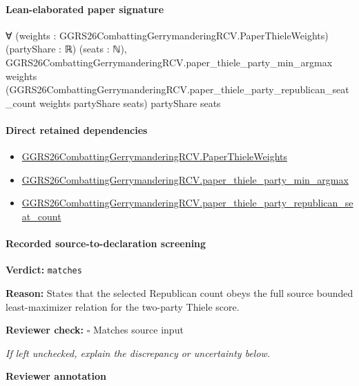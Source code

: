 \documentclass[10pt]{article}
\newcommand{\reviewerbox}{%
  \par\noindent\fbox{\parbox{0.96\linewidth}{\rule{0pt}{0.38in}}}\par
}
\newcommand{\reviewmatch}[1]{%
  \par\noindent\textbf{Reviewer check:} $\square$\; #1\par
  \noindent\emph{If left unchecked, explain the discrepancy or uncertainty below.}\par
}
\begin{document}
\paragraph{Lean-elaborated paper signature}
\begin{ReviewVerbatim}
∀ (weights : GGRS26CombattingGerrymanderingRCV.PaperThieleWeights) (partyShare : ℝ) (seats : ℕ),
  GGRS26CombattingGerrymanderingRCV.paper_thiele_party_min_argmax weights
    (GGRS26CombattingGerrymanderingRCV.paper_thiele_party_republican_seat_count weights partyShare seats) partyShare
    seats
\end{ReviewVerbatim}

\paragraph{Direct retained dependencies}
\begin{itemize}\raggedright
\item \hyperlink{paper-prerequisite-37b91baa3b4ddc9d}{GGRS26\allowbreak{}Combatting\allowbreak{}Gerrymandering\allowbreak{}RCV.\allowbreak{}Paper\allowbreak{}Thiele\allowbreak{}Weights}
\item \hyperlink{paper-prerequisite-58801459d14912d4}{GGRS26\allowbreak{}Combatting\allowbreak{}Gerrymandering\allowbreak{}RCV.\allowbreak{}paper\_\allowbreak{}thiele\_\allowbreak{}party\_\allowbreak{}min\_\allowbreak{}argmax}
\item \hyperlink{paper-prerequisite-5fa565502cdaaed9}{GGRS26\allowbreak{}Combatting\allowbreak{}Gerrymandering\allowbreak{}RCV.\allowbreak{}paper\_\allowbreak{}thiele\_\allowbreak{}party\_\allowbreak{}republican\_\allowbreak{}seat\_\allowbreak{}count}
\end{itemize}
\paragraph{Recorded source-to-declaration screening}
\textbf{Verdict:} \texttt{matches}
\\
{\raggedright
\textbf{Reason:} States that the selected Republican count obeys the full source bounded least-\allowbreak{}maximizer relation for the two-\allowbreak{}party Thiele score.\allowbreak{}
\par}
\reviewmatch{Matches source input}
\noindent\textbf{Reviewer annotation}\par
\reviewerbox
\clearpage
\hypertarget{paper-prerequisite-1ce27606523bc987}{}
\end{document}
